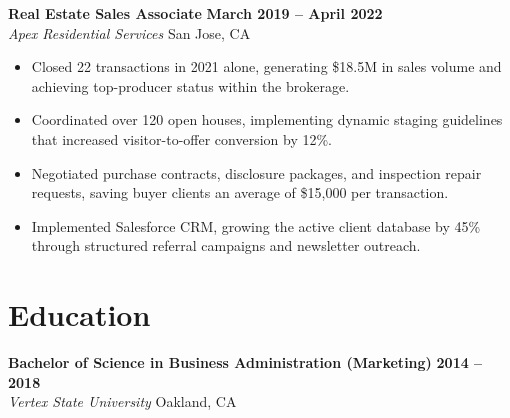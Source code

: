 \documentclass[10pt,oneside]{article}
\begin{document}
\vspace{0.65em}

\noindent
\textbf{Real Estate Sales Associate} \hfill \textbf{March 2019 -- April 2022} \\
\textit{Apex Residential Services} \hfill San Jose, CA
\begin{itemize}[leftmargin=1.5em, itemsep=2.5pt, parsep=0pt, topsep=2pt]
    \item Closed 22 transactions in 2021 alone, generating \$18.5M in sales volume and achieving top-producer status within the brokerage.
    \item Coordinated over 120 open houses, implementing dynamic staging guidelines that increased visitor-to-offer conversion by 12\%.
    \item Negotiated purchase contracts, disclosure packages, and inspection repair requests, saving buyer clients an average of \$15,000 per transaction.
    \item Implemented Salesforce CRM, growing the active client database by 45\% through structured referral campaigns and newsletter outreach.
\end{itemize}

\section*{Education}
\noindent
\textbf{Bachelor of Science in Business Administration (Marketing)} \hfill \textbf{2014 -- 2018} \\
\textit{Vertex State University} \hfill Oakland, CA
\end{document}
